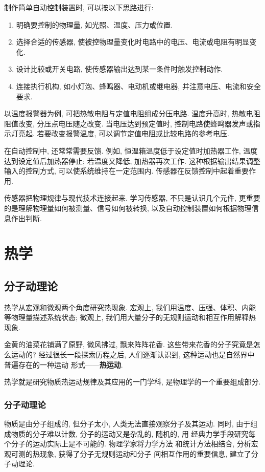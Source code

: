 \documentclass[11pt,a4paper]{ctexbook}
\begin{document}
制作简单自动控制装置时, 可以按以下思路进行:
\begin{enumerate}
    \item 明确要控制的物理量, 如光照、温度、压力或位置.
    \item 选择合适的传感器, 使被控物理量变化时电路中的电压、电流或电阻有明显变化.
    \item 设计比较或开关电路, 使传感器输出达到某一条件时触发控制动作.
    \item 连接执行机构, 如小灯泡、蜂鸣器、电动机或继电器, 并注意电压、电流和安全要求.
\end{enumerate}

以温度报警器为例, 可把热敏电阻与定值电阻组成分压电路. 温度升高时, 热敏电阻阻值改变,
分压点电压随之改变. 当电压达到预定值时, 控制电路使蜂鸣器发声或指示灯亮起. 若要改变报警温度,
可以调节定值电阻或比较电路的参考电压.

在自动控制中, 还常常需要反馈. 例如, 恒温箱温度低于设定值时加热器工作,
温度达到设定值后加热器停止; 若温度又降低, 加热器再次工作. 这种根据输出结果调整输入的控制方式,
可以使系统维持在一定范围内. 传感器在反馈控制中起着重要作用.

传感器把物理规律与现代技术连接起来. 学习传感器, 不只是认识几个元件,
更重要的是理解物理量如何被测量、信号如何被转换, 以及自动控制装置如何根据物理信息作出判断.

\part{热学}

\chapter{分子动理论}

热学从宏观和微观两个角度研究热现象. 宏观上, 我们用温度、压强、体积、内能等物理量描述系统状态; 微观上, 我们用大量分子的无规则运动和相互作用解释热现象.

金黄的油菜花铺满了原野, 微风拂过, 飘来阵阵花香. 这些带来花香的分子究竟是怎么运动的?
经过很长一段探索历程之后, 人们逐渐认识到, 这种运动也是自然界中普遍存在的一种运动
形式——\textbf{热运动}.

热学就是研究物质热运动规律及其应用的一门学科, 是物理学的一个重要组成部分.

\section{分子动理论}

物质是由分子组成的, 但分子太小, 人类无法直接观察分子及其运动.
同时, 由于组成物质的分子难以计数, 分子的运动又是杂乱的, 随机的, 用
经典力学手段研究每个分子的运动实际上是不可能的. 物理学家将力学方法
和统计方法相结合, 分析宏观可测的热现象, 获得了分子无规则运动和分子
间相互作用的重要信息, 建立了分子动理论.
\end{document}
